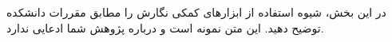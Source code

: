 در این بخش، شیوه استفاده از ابزارهای کمکی نگارش را مطابق مقررات دانشکده توضیح دهید. این متن نمونه است و درباره پژوهش شما ادعایی ندارد.
